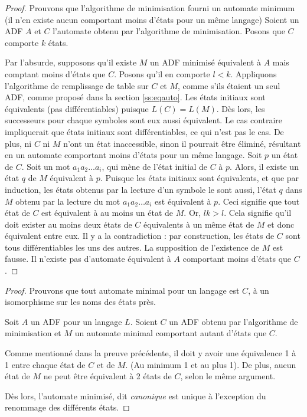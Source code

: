  
 	\begin{proof}
 		Prouvons que l'algorithme de minimisation fourni un automate minimum (il n'en existe aucun comportant moins d'états pour un même langage)
 		Soient un ADF $A$ et $C$ l'automate obtenu par l'algorithme de minimisation. Posons que $C$ comporte $k$ états.
 		
 		Par l'absurde, supposons qu'il existe $M$ un ADF minimisé équivalent à $A$ mais comptant moins d'états que $C$. Posons qu'il en comporte $l<k$.
 		Appliquons l'algorithme de remplissage de table sur $C$ et $M$, comme s'ils étaient un seul ADF, comme proposé dans la section \ref{ss:eqauto}. Les états initiaux sont équivalents (pas différentiables) puisque $L(C)=L(M)$. Dès lors, les successeurs pour chaque symboles sont eux aussi équivalent. Le cas contraire impliquerait que états initiaux sont différentiables, ce qui n'est pas le cas.
 		De plus, ni $C$ ni $M$ n'ont un état inaccessible, sinon il pourrait être éliminé, résultant en un automate comportant moins d'états pour un même langage.
 		Soit $p$ un état de $C$. Soit un mot $a_1a_2\dots a_i$, qui mène de l'état initial de $C$ à $p$. Alors, il existe un état $q$ de $M$ équivalent à $p$. Puisque les états initiaux sont équivalents, et que par induction, les états obtenus par la lecture d'un symbole le sont aussi, l'état $q$ dans $M$ obtenu par la lecture du mot $a_1a_2\dots a_i$ est équivalent à $p$. Ceci signifie que tout état de $C$ est équivalent à au moins un état de $M$.
 		Or, $lk>l$. Cela signifie qu'il doit exister au moins deux états de $C$ équivalents à un même état de $M$ et donc équivalent entre eux. Il y a la contradiction : par construction, les états de $C$ sont tous différentiables les uns des autres. La supposition de l'existence de $M$ est fausse. Il n'existe pas d'automate équivalent à $A$ comportant moins d'états que $C$. 		
 	\end{proof}
 
 	\begin{proof}
 		Prouvons que tout automate minimal pour un langage est $C$, à un isomorphisme sur les noms des états près.
 		
 		Soit $A$ un ADF pour un langage $L$. Soient $C$ un ADF obtenu par l'algorithme de minimisation et $M$ un automate minimal comportant autant d'états que $C$.
 		
 		Comme mentionné dans la preuve précédente, il doit y avoir une équivalence 1 à 1 entre chaque état de $C$ et de $M$. (Au minimum 1 et au plus 1). De plus, aucun état de $M$ ne peut être équivalent à 2 états de $C$, selon le même argument.
 		
 		Dès lors, l'automate minimisé, dit \emph{canonique} est unique à l'exception du renommage des différents états. 		 
 	\end{proof}
 
